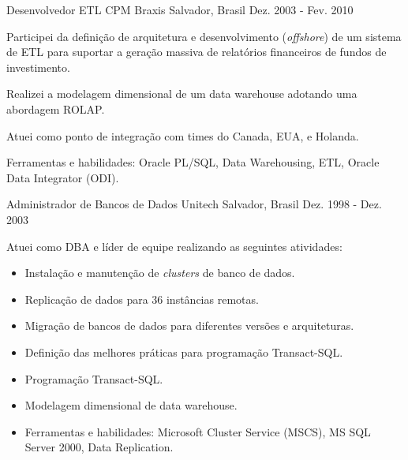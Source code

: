 \begin{cventries}
\cventry
{Desenvolvedor ETL} %
{CPM Braxis} %
{Salvador, Brasil} %
{Dez. 2003 - Fev. 2010} %
{ %
\begin{cvitems}
\item{Participei da definição de arquitetura e desenvolvimento (\textit{offshore}) de um sistema de ETL para suportar a geração massiva de relatórios financeiros de fundos de investimento.} 
\item{Realizei a modelagem dimensional de um data warehouse adotando uma abordagem ROLAP.}
\item{Atuei como ponto de integração com times do Canada, EUA, e Holanda.}
\item{Ferramentas e habilidades: Oracle PL/SQL, Data Warehousing, ETL, Oracle Data Integrator (ODI).}
\end{cvitems}
}


\cventry
{Administrador de Bancos de Dados} %
{Unitech} %
{Salvador, Brasil} %
{Dez. 1998 - Dez. 2003} %
{ %
\begin{cvitems}
	\item{Atuei como DBA e líder de equipe realizando as seguintes atividades:}
	\begin{itemize}	
		\item{Instalação e manutenção de \textit{clusters} de banco de dados.}
		\item{Replicação de dados para 36 instâncias remotas.} 
		\item{Migração de bancos de dados para diferentes versões e arquiteturas.}
		\item{Definição das melhores práticas para programação Transact-SQL.}
		\item{Programação Transact-SQL.}
		\item{Modelagem dimensional de data warehouse.}
		\item{Ferramentas e habilidades: Microsoft Cluster Service (MSCS), MS SQL Server 2000, Data Replication.}
	\end{itemize}
\end{cvitems}
}


\end{cventries}